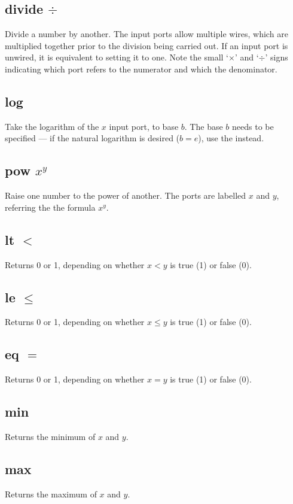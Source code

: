 \subsection{divide $\div$}\label{Operation:divide} Divide a number by another. The
  input ports allow multiple wires, which are multiplied together
  prior to the division being carried out. If an input port is
  unwired, it is equivalent to setting it to one. Note the small
  `$\times$' and `$\div$' signs indicating which port refers to the
  numerator and which the denominator.

\subsection{log}\label{Operation:log} Take the logarithm of the $x$ input port, to
base $b$. The base $b$ needs to be specified --- if the natural
logarithm is desired ($b=e$), use the  instead.

\subsection{pow $x^y$}\label{Operation:pow} Raise one number to the power of another. The
ports are labelled $x$ and $y$, referring the the formula $x^y$.

\subsection{lt $<$}\label{Operation:lt} Returns 0 or 1, depending
  on whether $x<y$ is true (1) or false (0).

\subsection{le $\le$}\label{Operation:le} Returns 0 or 1, depending
  on whether $x\le y$ is true (1) or false (0).

\subsection{eq $=$}\label{Operation:eq} Returns 0 or 1, depending
  on whether $x=y$ is true (1) or false (0).

\subsection{min}\label{Operation:min} Returns the minimum of $x$ and $y$.

\subsection{max}\label{Operation:max} Returns the maximum of $x$ and $y$.

